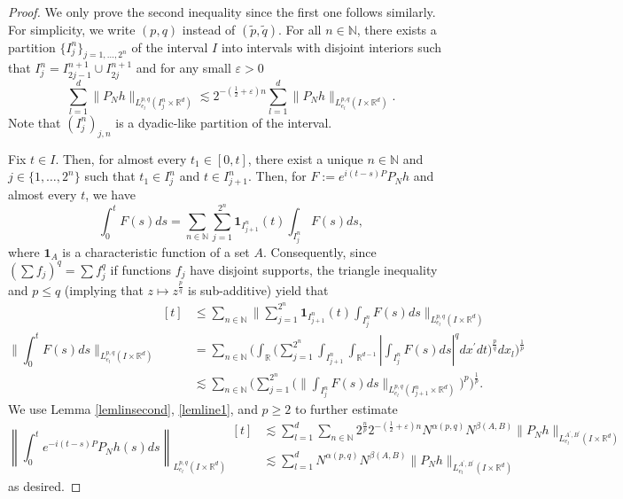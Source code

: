 \documentclass[aihp]{imsart}
\numberwithin{equation}{section}
\theoremstyle{plain}
\theoremstyle{remark}
\newcommand{\R}{\mathbb{R}}
\newcommand{\N}{\mathbb{N}}
\begin{document}
\begin{proof}
We only prove the second inequality  since the first one follows similarly.
For simplicity, we write $(p, q)$ instead of $(\tilde{p}, \tilde{q})$. 
For all $n\in \N$, there exists a partition $\{I_j^n\}_{j=1,\ldots ,2^n}$ of the interval $I$ into intervals
with disjoint interiors such that $I_j^n = I_{2j - 1}^{n + 1} \cup I_{2j}^{n+1}$ and for any small $\varepsilon > 0$
\begin{equation}
\label{lemline1}
\sum_{l=1}^d \|P_N h\|_{L_{e_l}^{p,q} (I_j^n \times \R^d)} \lesssim 2^{-(\frac{1}{2} + \varepsilon) n}\sum_{l=1}^d \|P_N h\|_{L_{e_l}^{p,q} (I \times \R^d) }.
\end{equation}
Note that $(I^n_j)_{j, n}$ is a dyadic-like partition of the interval. 

Fix $t \in I$. Then, for almost every $t_1 \in [0, t]$, there exist a unique $n\in \N$ and $j\in \{1,\ldots ,2^n\}$ such that $t_1\in I_j^n$ and $t \in I_{j+1}^n$.
Then, for $F := e^{i(t-s)P}P_N h$ and almost every $t$, we have
$$\int_0^t F(s) ds = \sum_{n\in \N} \sum_{j=1}^{2^n} \mathbf{1}_{I^n_{j+1}}(t) \int_{I_j^n} F(s) ds, $$
where $\mathbf{1}_{A}$ is a characteristic function of a set $A$. Consequently, since $(\sum f_j)^q = \sum f_j^q$ if 
functions $f_j$ have disjoint supports,  the triangle inequality and  $p \leq q$ (implying that $z \mapsto z^{\frac{p}{q}}$ is sub-additive) yield that  
\begin{equation*}
\bigg \|\int_0^t F(s) ds \bigg\|_{L_{e_l}^{p,q}(I \times \R^d)} 
\begin{aligned}[t]
& \leq \sum_{n\in \N} \bigg \| \sum_{j=1}^{2^n} \mathbf{1}_{I^n_{j+1}}(t) \int_{I^n_j} F(s) ds \bigg\|_{L_{e_l}^{p,q}(I \times \R^d)} \\
&= \sum_{n\in \N}\bigg(\int_{\R} \bigg(\sum_{j=1}^{2^n} \int_{I_{j+1}^n} \int_{\R^{d-1}} \left|\int_{I^n_j } F(s) ds \right|^q dx^\prime dt\bigg)^{\frac{p}{q}}  dx_l \bigg)^{\frac{1}{p}}\\
&\lesssim \sum_{n\in \N} \bigg(\sum_{j=1}^{2^n} \bigg(\bigg\|\int_{I_j^n} F(s) ds \bigg\|_{L_{e_l}^{p,q} (I_{j+1}^n \times \R^d)} \bigg)^p \bigg)^{\frac{1}{p}}.
\end{aligned}
\end{equation*}
We use Lemma \ref{lemlinsecond}, \eqref{lemline1}, and $p \geq 2$  to further estimate 
\begin{equation*}
\left\|\int_0^t e^{-i(t-s) P} P_N h(s) ds \right\|_{L_{e_l}^{p,q}(I \times \R^d)}
\begin{aligned}[t]
&\lesssim  \sum_{l = 1}^d \sum_{n\in \N} 2^{\frac{n}{p}} 2^{-(\frac{1}{2} + \varepsilon ) n}  N^{\alpha (p,q)} N^{\beta (A,B)} \|P_N h\|_{L_{e_l}^{A^\prime ,B^\prime}(I\times \R^d )}  \\
&\lesssim  \sum_{l = 1}^d N^{\alpha (p ,q)}  N^{\beta (A,B)} \|P_N h\|_{L_{e_l}^{A^\prime ,B^\prime} (I\times \R^d )}
\end{aligned} 
\end{equation*}
as desired.
\end{proof}
\end{document}

